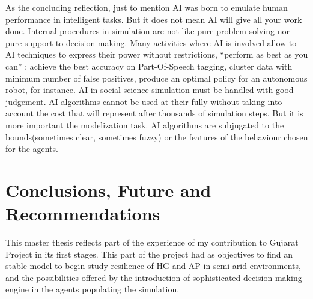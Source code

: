 \documentclass[11pt,oneside,a4paper,openright]{report}
\begin{document}
As the concluding reflection, just to mention AI was born to emulate human performance in intelligent tasks. But it does not mean AI will give all your work done. Internal procedures in simulation are not like pure problem solving nor pure support to decision making. Many activities where AI is involved allow to AI techniques to express their power without restrictions, ``perform as best as you can'' : achieve the best accuracy on Part-Of-Speech tagging, cluster data with minimum number of false positives, produce an optimal policy for an autonomous robot, for instance. AI in social science simulation must be handled with good judgement. AI algorithms cannot be used at their fully without taking into account the cost that will represent after thousands of simulation steps. But it is more important the modelization task. AI algorithms are subjugated to the bounds(sometimes clear, sometimes fuzzy) or the features of the behaviour chosen for the agents. 



\chapter{Conclusions, Future and Recommendations}


This master thesis reflects part of the experience of my contribution to Gujarat Project in
its first stages. This part of the project had as objectives to find an stable model to begin
study resilience of HG and AP in semi-arid environments, and the possibilities offered by the
introduction of sophisticated decision making engine in the agents populating the simulation.
\end{document}
